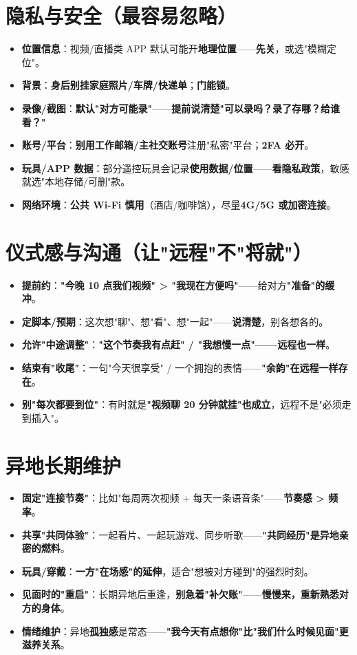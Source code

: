 \documentclass[12pt,UTF8,openany]{ctexbook}
\begin{document}
\section{隐私与安全（最容易忽略）}
\begin{itemize}[leftmargin=2em,itemsep=0.3em]
  \item \textbf{位置信息}：视频/直播类 APP 默认可能开\textbf{地理位置}——\textbf{先关}，或选"模糊定位"。
  \item \textbf{背景}：\textbf{身后别挂家庭照片/车牌/快递单}；\textbf{门能锁}。
  \item \textbf{录像/截图}：\textbf{默认"对方可能录"}——\textbf{提前说清楚"可以录吗？录了存哪？给谁看？"}
  \item \textbf{账号/平台}：\textbf{别用工作邮箱/主社交账号}注册"私密"平台；\textbf{2FA 必开}。
  \item \textbf{玩具/APP 数据}：部分遥控玩具会记录\textbf{使用数据/位置}——\textbf{看隐私政策}，敏感就选"本地存储/可删"款。
  \item \textbf{网络环境}：\textbf{公共 Wi-Fi 慎用}（酒店/咖啡馆），尽量\textbf{4G/5G 或加密连接}。
\end{itemize}

\section{仪式感与沟通（让"远程"不"将就"）}
\begin{itemize}[leftmargin=2em,itemsep=0.3em]
  \item \textbf{提前约}：\textbf{"今晚 10 点我们视频" > "我现在方便吗"}——给对方\textbf{"准备"的缓冲}。
  \item \textbf{定脚本/预期}：这次想"聊"、想"看"、想"一起"——\textbf{说清楚}，别各想各的。
  \item \textbf{允许"中途调整"}：\textbf{"这个节奏我有点赶" / "我想慢一点"——远程也一样}。
  \item \textbf{结束有"收尾"}：一句"今天很享受" / 一个拥抱的表情——\textbf{"余韵"在远程一样存在}。
  \item \textbf{别"每次都要到位"}：有时就是\textbf{"视频聊 20 分钟就挂"也成立}，远程不是"必须走到插入"。
\end{itemize}

\section{异地长期维护}
\begin{itemize}[leftmargin=2em,itemsep=0.3em]
  \item \textbf{固定"连接节奏"}：比如"每周两次视频 + 每天一条语音条"——\textbf{节奏感 > 频率}。
  \item \textbf{共享"共同体验"}：一起看片、一起玩游戏、同步听歌——\textbf{"共同经历"是异地亲密的燃料}。
  \item \textbf{玩具/穿戴}：\textbf{一方"在场感"的延伸}，适合"想被对方碰到"的强烈时刻。
  \item \textbf{见面时的"重启"}：长期异地后重逢，\textbf{别急着"补欠账"}——\textbf{慢慢来，重新熟悉对方的身体}。
  \item \textbf{情绪维护}：异地\textbf{孤独感}是常态——\textbf{"我今天有点想你"比"我们什么时候见面"更滋养关系}。
\end{itemize}
\end{document}
